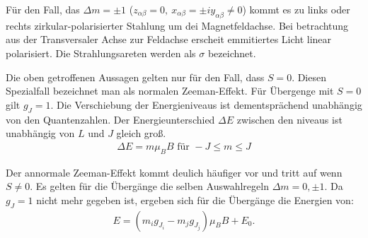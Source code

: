 Für den Fall, das $\Delta m = \pm 1$ ($z_{\alpha\beta} = 0,\ x_{\alpha\beta} = \pm i y_{\alpha\beta} \neq 0$) kommt es zu links oder rechts zirkular-polarisierter Stahlung um dei Magnetfeldachse.
Bei betrachtung aus der Transversaler Achse zur Feldachse erscheit emmitiertes Licht linear polarisiert.
Die Strahlungsareten werden als $\sigma$ bezeichnet.

Die oben getroffenen Aussagen gelten nur für den Fall, dass $S=0$.
Diesen Spezialfall bezeichnet man als normalen Zeeman-Effekt.
Für Übergenge mit $S=0$ gilt $g_J = 1$. Die Verschiebung der Energieniveaus ist dementsprächend unabhängig von den Quantenzahlen.
Der Energieunterschied $\Delta E$ zwischen den niveaus ist unabhängig von $L$ und $J$ gleich groß.
\begin{align}
  \Delta E = m \mu_B B \text{ für } -J \leq m \leq J
  \label{eqn:normal}
\end{align}

Der annormale Zeeman-Effekt kommt deulich häufiger vor und tritt auf wenn $S \neq 0$.
Es gelten für die Übergänge die selben Auswahlregeln $\Delta m = 0, \pm 1$.
Da $g_J = 1$ nicht mehr gegeben ist, ergeben sich für die Übergänge die Energien von:
\begin{align}
	E=(m_ig_{J_i}-m_jg_{J_j})\mu_BB+E_0.
  \label{eqn:anormal}
\end{align}

